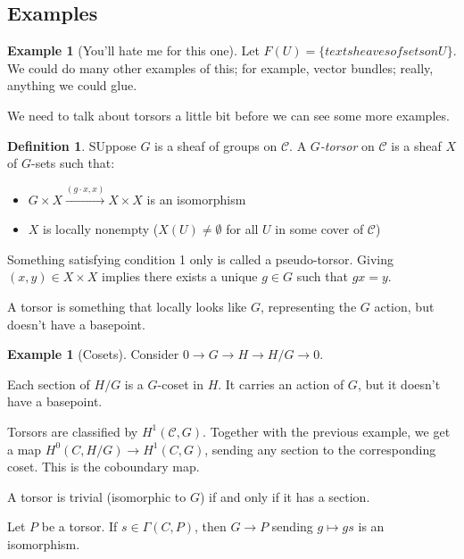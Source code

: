 \documentclass{amsart}
\theoremstyle{definition}
\newtheorem{definition}[dummy]{Definition}
\newtheorem{example}[dummy]{Example}
\begin{document}
\subsection{Examples}

\begin{example}[You'll hate me for this one]
Let $F(U)=\{text{sheaves of sets on } U\}$.  We could do many other examples of this; for example, vector bundles; really, anything we could glue.
\end{example}

We need to talk about torsors a little bit before we can see some more examples.

\begin{definition}
SUppose $G$ is a sheaf of groups on $\mathcal{C}$.  A \emph{$G$-torsor} on $\mathcal{C}$ is a sheaf $X$ of $G$-sets such that:
\begin{itemize}
\item $G\times X\stackrel{(g\cdot x, x)}\longrightarrow X\times X$
is an isomorphism 
\item $X$ is locally nonempty ($X(U)\neq \emptyset$ for all $U$ in some cover of $\mathcal{C}$)
\end{itemize}
\end{definition}

Something satisfying condition 1 only is called a pseudo-torsor.  Giving $(x,y)\in X\times X$ implies there exists a unique $g\in G$ such that $gx=y$.

A torsor is something that locally looks like $G$, representing the $G$ action, but doesn't have a basepoint.

\begin{example}[Cosets]

Consider $0\to G\to H\to H/G\to 0$.

Each section of $H/G$ is a $G$-coset in $H$.  It carries an action of $G$, but it doesn't have a basepoint.

\end{example}

Torsors are classified by $H^1(\mathcal{C}, G)$.  Together with the previous example, we get a map $H^0(C, H/G)\to H^1(C, G)$, sending any section to the corresponding coset.  This is the coboundary map.


A torsor is trivial (isomorphic to $G$) if and only if it has a section.  


Let $P$ be a torsor.  If $s\in \Gamma(C, P)$, then $G\to P$ sending $g\mapsto gs$ is an isomorphism.
\end{document}
